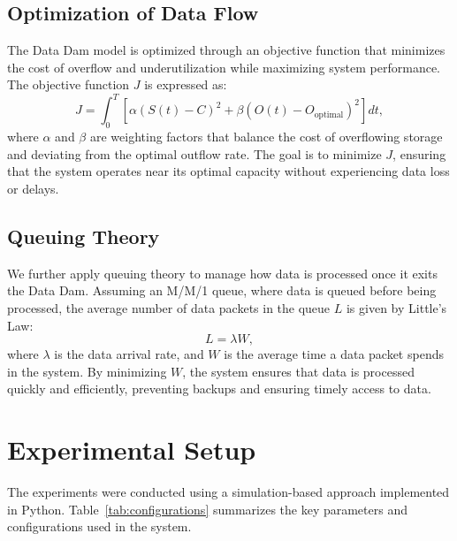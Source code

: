 \subsection{Optimization of Data Flow}

The Data Dam model is optimized through an objective function that minimizes the cost of overflow and underutilization while maximizing system performance. The objective function \( J \) is expressed as:
\begin{equation}
J = \int_0^T \left[ \alpha (S(t) - C)^2 + \beta (O(t) - O_{\text{optimal}})^2 \right] dt,
\end{equation}
where \( \alpha \) and \( \beta \) are weighting factors that balance the cost of overflowing storage and deviating from the optimal outflow rate. The goal is to minimize \( J \), ensuring that the system operates near its optimal capacity without experiencing data loss or delays.

\subsection{Queuing Theory}

We further apply queuing theory to manage how data is processed once it exits the Data Dam. Assuming an M/M/1 queue, where data is queued before being processed, the average number of data packets in the queue \( L \) is given by Little's Law:
\begin{equation}
L = \lambda W,
\end{equation}
where \( \lambda \) is the data arrival rate, and \( W \) is the average time a data packet spends in the system. By minimizing \( W \), the system ensures that data is processed quickly and efficiently, preventing backups and ensuring timely access to data.

\section{Experimental Setup}

The experiments were conducted using a simulation-based approach implemented in Python. Table~\ref{tab:configurations} summarizes the key parameters and configurations used in the system.

